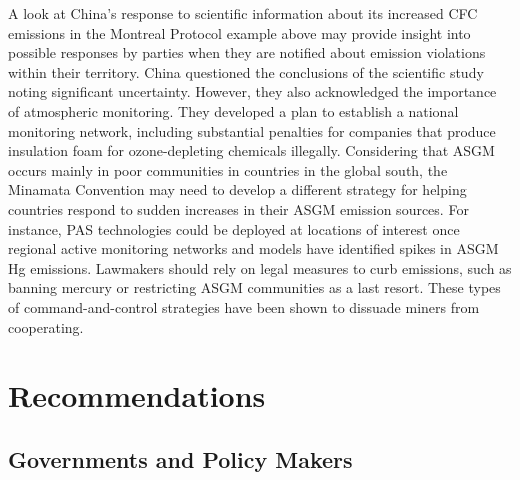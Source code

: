 \begin{flushleft}
A look at China's response to scientific information about its increased CFC emissions in the Montreal Protocol example above may provide insight into possible responses by parties when they are notified about emission violations within their territory. China questioned the conclusions of the scientific study noting significant uncertainty. However, they also acknowledged the importance of atmospheric monitoring. They developed a plan to establish a national monitoring network, including substantial penalties for companies that produce insulation foam for ozone-depleting chemicals illegally. Considering that ASGM occurs mainly in poor communities in countries in the global south, the Minamata Convention may need to develop a different strategy for helping countries respond to sudden increases in their ASGM emission sources. For instance, PAS technologies could be deployed at locations of interest once regional active monitoring networks and models have identified spikes in ASGM Hg emissions. Lawmakers should rely on legal measures to curb emissions, such as banning mercury or restricting ASGM communities as a last resort. These types of command-and-control strategies have been shown to dissuade miners from cooperating.
\end{flushleft}




\section{Recommendations}
\subsection{Governments and Policy Makers}

